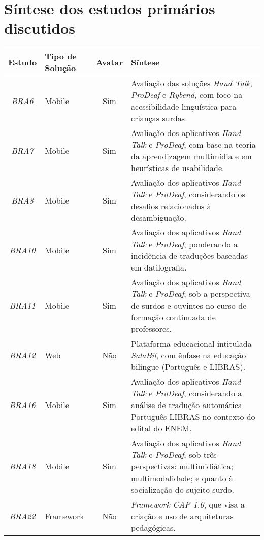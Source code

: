 \chapter{Síntese dos estudos primários discutidos}
\label{apendice:estudos-primarios}

\begin{small}
\setlength\tabcolsep{0.1cm}
\begin{longtable}{|c|>{\centering\arraybackslash}p{2.75cm}|c|p{10cm}|}
\hline
\textbf{Estudo} & \textbf{Tipo de Solução} & \textbf{Avatar} & \textbf{Síntese} \\ \hline
\textit{BRA6} & Mobile & Sim & Avaliação das soluções \textit{Hand Talk}, \textit{ProDeaf} e \textit{Rybená}, com foco na acessibilidade linguística para crianças surdas. \\ \hline
\textit{BRA7} & Mobile & Sim & Avaliação dos aplicativos \textit{Hand Talk} e \textit{ProDeaf}, com base na teoria da aprendizagem multimídia e em heurísticas de usabilidade. \\ \hline
\textit{BRA8} & Mobile & Sim & Avaliação dos aplicativos \textit{Hand Talk} e \textit{ProDeaf}, considerando os desafios relacionados à desambiguação. \\ \hline
\textit{BRA10} & Mobile & Sim & Avaliação dos aplicativos \textit{Hand Talk} e \textit{ProDeaf}, ponderando a incidência de traduções baseadas em datilografia. \\ \hline
\textit{BRA11} & Mobile & Sim & Avaliação dos aplicativos \textit{Hand Talk} e \textit{ProDeaf}, sob a perspectiva de surdos e ouvintes no curso de formação continuada de professores. \\ \hline
\textit{BRA12} & Web & Não & Plataforma educacional intitulada \textit{SalaBil}, com ênfase na educação bilíngue (Português e LIBRAS). \\ \hline
\textit{BRA16} & Mobile & Sim & Avaliação dos aplicativos \textit{Hand Talk} e \textit{ProDeaf}, considerando a análise de tradução automática Português-LIBRAS no contexto do edital do ENEM. \\ \hline
\textit{BRA18} & Mobile & Sim & Avaliação dos aplicativos \textit{Hand Talk} e \textit{ProDeaf}, sob três perspectivas: multimidiática; multimodalidade; e quanto à socialização do sujeito surdo. \\ \hline
\textit{BRA22} & Framework & Não & \textit{Framework CAP 1.0}, que visa a criação e uso de arquiteturas pedagógicas. \\ \hline

\end{longtable}
\end{small}
